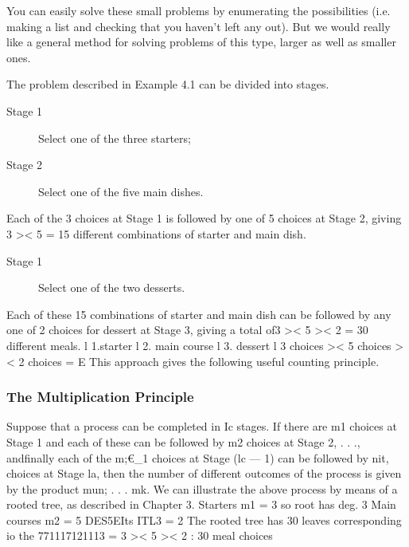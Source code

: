 \documentclass{beamer}
\begin{document}
\begin{frame}
\begin{frame}
\end{frame}
\begin{frame}
You can easily solve these small problems by enumerating the
possibilities (i.e. making a list and checking that you haven't left any
out). But we would really like a general method for solving
problems of this type, larger as well as smaller ones.
\end{frame}
\begin{frame}
The problem described in Example 4.1 can be divided into stages.
\begin{description}
\item[Stage 1] Select one of the three starters;
\item[Stage 2] Select one of the ﬁve main dishes.
\end{description}
Each of the 3 choices at Stage 1 is followed by one of 5 choices
at Stage 2, giving 3 >< 5 = 15 different combinations of starter
and main dish.
\end{frame}
\begin{frame}
\begin{description}
\item[Stage 1] Select one of the two desserts.
\end{description}
Each of these 15 combinations of starter and main dish can be
followed by any one of 2 choices for dessert at Stage 3, giving a
total of3 >< 5 >< 2 = 30 different meals.
l 1.starter l 2. main course l 3. dessert l
3 choices >< 5 choices >< 2 choices = E
This approach gives the following useful counting principle.
\end{frame}
\begin{frame}
\frametitle{The Multiplication Principle}
Suppose that a process can be completed in Ic stages. If there are m1
choices at Stage 1 and each of these can be followed by m2 choices at
Stage 2, . . ., andﬁnally each of the m;€_1 choices at Stage (lc — 1) can
be followed by nit, choices at Stage la, then the number of different
outcomes of the process is given by the product mun; . . . mk.
We can illustrate the above process by means of a rooted tree, as
described in Chapter 3.
Starters
m1 = 3
so root has deg. 3
Main courses
m2 = 5
DES5EIts
ITL3 = 2
The rooted tree has 30 leaves
corresponding io the 771117121113 = 3 >< 5 >< 2 : 30 meal choices
\end{frame}
\begin{frame}


\end{frame}
\end{frame}
\end{document}
